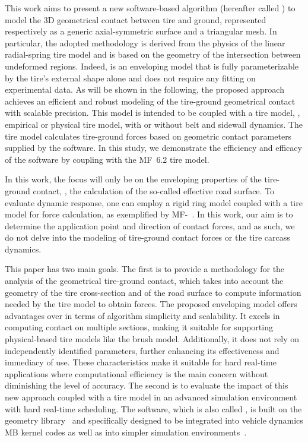 This work aims to present a new software-based algorithm (hereafter called \Enve{}) to model the 3D geometrical contact between tire and ground, represented respectively as a generic axial-symmetric surface and a triangular mesh. In particular, the adopted methodology is derived from the physics of the linear radial-spring tire model and is based on the geometry of the intersection between undeformed regions. Indeed, \Enve{} is an enveloping model that is fully parameterizable by the tire's external shape alone and does not require any fitting on experimental data. As will be shown in the following, the proposed approach achieves an efficient and robust modeling of the tire-ground geometrical contact with scalable precision. This model is intended to be coupled with a tire model, \ie{}, empirical or physical tire model, with or without belt and sidewall dynamics. The tire model calculates tire-ground forces based on geometric contact parameters supplied by the \Enve{} software. In this study, we demonstrate the efficiency and efficacy of the software by coupling \Enve{} with the MF~6.2 tire model.
%
\begin{remark}
  In this work, the focus will only be on the enveloping properties of the tire-ground contact, \ie{}, the calculation of the so-called effective road surface. To evaluate dynamic response, one can employ a rigid ring model coupled with a tire model for force calculation, as exemplified by \ac{MF}-\Swift{}~\cite{pacejka2012tire, schmeitz2004semiempirical}. In this work, our aim is to determine the application point and direction of contact forces, and as such, we do not delve into the modeling of tire-ground contact forces or the tire carcass dynamics.
\end{remark}
%
This paper has two main goals. The first is to provide a methodology for the analysis of the geometrical tire-ground contact, which takes into account the geometry of the tire cross-section and of the road surface to compute information needed by the tire model to obtain forces. The proposed enveloping model offers advantages over \Swift{} in terms of algorithm simplicity and scalability. It excels in computing contact on multiple sections, making it suitable for supporting physical-based tire models like the brush model. Additionally, it does not rely on independently identified parameters, further enhancing its effectiveness and immediacy of use. These characteristics make it suitable for hard real-time applications where computational efficiency is the main concern without diminishing the level of accuracy. The second is to evaluate the impact of this new approach coupled with a tire model in an advanced simulation environment with hard real-time scheduling. The software, which is also called \Enve{}, is built on the \Acme{} geometry library~\cite{stocco2021acme} and specifically designed to be integrated into vehicle dynamics MB kernel codes as well as into simpler simulation environments~\cite{piccinini2022predictive, piccinini2023physics}.

